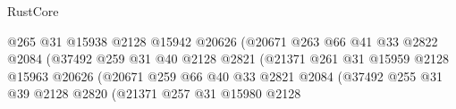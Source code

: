 \begin{lexlean}{RustCore}
\begin{coremodule}
                                                @265
                                                @31
                                                @15938
                                                @2128
                                                @15942
                                                @20626
                                                (@20671
                                                  @263
                                                  @66
                                                  @41
                                                  @33
                                                  @2822
                                                  @2084
                                                  (@37492
                                                    @259
                                                    @31
                                                    @40
                                                    @2128
                                                    @2821
                                                    (@21371
                                                      @261
                                                      @31
                                                      @15959
                                                      @2128
                                                      @15963
                                                      @20626
                                                      (@20671
                                                        @259
                                                        @66
                                                        @40
                                                        @33
                                                        @2821
                                                        @2084
                                                        (@37492
                                                          @255
                                                          @31
                                                          @39
                                                          @2128
                                                          @2820
                                                          (@21371
                                                            @257
                                                            @31
                                                            @15980
                                                            @2128

\end{coremodule}
\end{lexlean}
